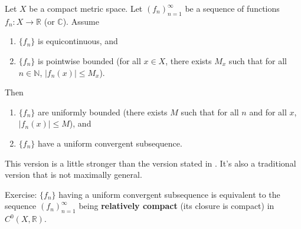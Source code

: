\begin{theorem}\label{ra.arzela.ascoli}

Let \(X\) be a compact metric space. Let \((f_n)_{n=1}^\infty\) be a sequence of functions \(f_n: X \to \mathbb{R}\) (or \(\mathbb{C}\)). Assume

\begin{enumerate}

\item \(\{f_n\}\) is equicontinuous, and

\item  \(\{f_n\}\) is pointwise bounded (for all \(x \in X\), there exists \(M_x\) such that for all \(n \in \mathbb{N}\), \(|f_n(x)| \leq M_x\)).

\end{enumerate}

Then

\begin{enumerate}

\item  \(\{f_n\}\) are uniformly bounded (there exists \(M\) such that for all \(n\) and for all \(x\), \(|f_n(x) | \leq M\)), and

\item  \(\{f_n\}\) have a uniform convergent subsequence. 

\end{enumerate}

\end{theorem}

\begin{remark}

This version is a little stronger than the version stated in \citet{pugh2015real}. It's also a traditional version that is not maximally general.

Exercise: \(\{f_n\}\) having a uniform convergent subsequence is equivalent to the sequence \((f_n)_{n=1}^\infty\) being \textbf{relatively compact} (its closure is compact) in \(C^0(X, \mathbb{R})\).
 
 \end{remark}


